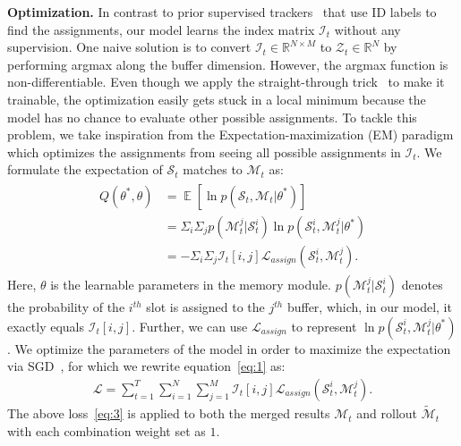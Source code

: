\vspace{+2.5mm}
\noindent \textbf{Optimization.}
In contrast to prior supervised trackers~\cite{cai2022memot, zeng2022motr} that use ID labels to find the assignments, our model learns the index matrix $\mathcal{I}_t$ without any supervision. One naive solution is to convert $\mathcal{I}_t\in \mathbb{R}^{N\times M}$  to $\mathcal{Z}_t \in \mathbb{R}^{N}$ by performing argmax along the buffer dimension. However,  the argmax function is non-differentiable. 
Even though we apply the straight-through trick~\cite{jang2016categorical} to make it trainable, the optimization easily gets stuck in a local minimum because the model has no chance to evaluate other possible assignments.
To tackle this problem, we take inspiration from the Expectation-maximization (EM) paradigm which optimizes the assignments from seeing all possible assignments in $\mathcal{I}_t$. We formulate the expectation of $\mathcal{S}_t$ matches to $\mathcal{M}_t$ as:
\begin{gather}
\begin{aligned}
    Q(\theta^*, \theta) &= \mathop{\mathbb{E}} [\ln p(\mathcal{S}_t, \mathcal{M}_t|\theta ^*)] \\
    &= \Sigma_{i}\Sigma_{j} p(\mathcal{M}_t^j | \mathcal{S}_t^i) \ln p(\mathcal{S}_t^i, \mathcal{M}_t^j|\theta ^*) \\
    & = -\Sigma_{i}\Sigma_{j} \mathcal{I}_t[i,j]\mathcal{L}_{assign}(\mathcal{S}_t^i, \mathcal{M}_t^j).
\end{aligned}
\end{gather}
Here, $\theta$ is the learnable parameters in the memory module. $p(\mathcal{M}_t^j | \mathcal{S}_t^i)$ denotes the probability of the $i^{th}$ slot is assigned to the $j^{th}$ buffer, which, in our model, it exactly equals $\mathcal{I}_t[i, j]$. Further, we can use $\mathcal{L}_{assign}$ to represent $\ln p(\mathcal{S}_t^i, \mathcal{M}_t^j|\theta ^*)$.
We optimize the parameters of the model in order to maximize the expectation via SGD~\cite{ruder2016overview}, for which we rewrite equation~\eqref{eq:1} as:
\begin{gather}
\mathcal{L} = \sum_{t=1}^{T}\sum_{i=1}^{N}\sum_{j=1}^{M} \mathcal{I}_t[i,j]\mathcal{L}_{assign}(\mathcal{S}_t^i, \mathcal{M}_t^j).
\label{eq:3}
\end{gather}
The above loss~\eqref{eq:3} is applied to both the merged results $\mathcal{M}_t$ and rollout $\tilde {\mathcal{M}}_t$ with each combination weight set as $1$. 




